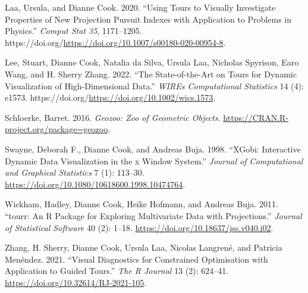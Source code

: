 \begin{CSLReferences}{1}{0}
\leavevmode{}%
Laa, Ursula, and Dianne Cook. 2020. {``Using Tours to Visually Investigate Properties of New Projection Pursuit Indexes with Application to Problems in Physics.''} \emph{Comput Stat 35}, 1171--1205. https://doi.org/\url{https://doi.org/10.1007/s00180-020-00954-8}.

\leavevmode{}%
Lee, Stuart, Dianne Cook, Natalia da Silva, Ursula Laa, Nicholas Spyrison, Earo Wang, and H. Sherry Zhang. 2022. {``The State-of-the-Art on Tours for Dynamic Visualization of High-Dimensional Data.''} \emph{WIREs Computational Statistics} 14 (4): e1573. https://doi.org/\url{https://doi.org/10.1002/wics.1573}.

\leavevmode{}%
Schloerke, Barret. 2016. \emph{Geozoo: Zoo of Geometric Objects}. \url{https://CRAN.R-project.org/package=geozoo}.

\leavevmode{}%
Swayne, Deborah F., Dianne Cook, and Andreas Buja. 1998. {``XGobi: Interactive Dynamic Data Visualization in the x Window System.''} \emph{Journal of Computational and Graphical Statistics} 7 (1): 113--30. \url{https://doi.org/10.1080/10618600.1998.10474764}.

\leavevmode{}%
Wickham, Hadley, Dianne Cook, Heike Hofmann, and Andreas Buja. 2011. {``{tourr}: An {R} Package for Exploring Multivariate Data with Projections.''} \emph{Journal of Statistical Software} 40 (2): 1--18. \url{https://doi.org/10.18637/jss.v040.i02}.

\leavevmode{}%
Zhang, H. Sherry, Dianne Cook, Ursula Laa, Nicolas Langrené, and Patricia Menéndez. 2021. {``Visual Diagnostics for Constrained Optimisation with Application to Guided Tours.''} \emph{The R Journal} 13 (2): 624--41. \url{https://doi.org/10.32614/RJ-2021-105}.

\end{CSLReferences}



\address{%
Zoljargal Batsaikhan\\
Monash University\\%
Department of Econometrics and Business Statistics\\ Clayton, VIC, Australia\\
%
\url{https://github.com/zolabat}\\%
\textit{ORCiD: \href{https://orcid.org/0009-0005-0055-1448}{0009-0005-0055-1448}}\\%
\href{mailto:zoljargal11@gmail.com}{\nolinkurl{zoljargal11@gmail.com}}%
}


